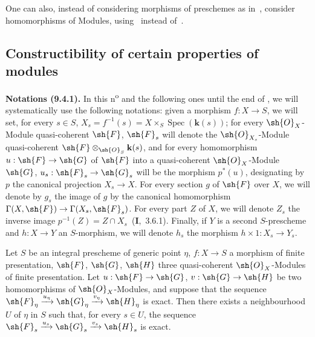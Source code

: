 One can also, instead of considering morphisms of preschemes as in~, consider homomorphisms of Modules, using~ instead of~.


\subsection{Constructibility of certain properties of modules}
\label{subsection:IV.9.4}

\begin{env}[9.4.1]
\label{IV.9.4.1}
\textbf{Notations (9.4.1).}
In this n\textsuperscript{o} and the following ones until the end of , we will systematically use the following notations: given a morphism $f:X\to S$, we will set, for every $s\in S$, $X_s=f^{-1}(s)=X\times_S\operatorname{Spec}(\mathbf{k}(s))$; for every $\sh{O}_X$-Module quasi-coherent $\sh{F}$, $\sh{F}_s$ will denote the $\sh{O}_{X_s}$-Module quasi-coherent $\sh{F}\otimes_{\sh{O}_S}\mathbf{k}(s)$, and for every homomorphism $u:\sh{F}\to\sh{G}$ of $\sh{F}$ into a quasi-coherent $\sh{O}_X$-Module $\sh{G}$, $u_s:\sh{F}_s\to\sh{G}_s$ will be the morphism $p^*(u)$, designating by $p$ the canonical projection $X_s\to X$.
For every section $g$ of $\sh{F}$ over $X$, we will denote by $g_s$ the image of $g$ by the canonical homomorphism $\Gamma(X,\sh{F})\to\Gamma(X_s,\sh{F}_s)$.
For every part $Z$ of $X$, we will denote $Z_s$ the inverse image $p^{-1}(Z)=Z\cap X_s$~(\textbf{I},~3.6.1).
Finally, if $Y$ is a second $S$-prescheme and $h:X\to Y$ an $S$-morphism, we will denote $h_s$ the morphism $h\times 1:X_s\to Y_s$.
\end{env}

\begin{proposition}[9.4.2]
\label{IV.9.4.2}
Let $S$ be an integral prescheme of generic point $\eta$, $f:X\to S$ a morphism of finite presentation, $\sh{F}$, $\sh{G}$, $\sh{H}$ three quasi-coherent $\sh{O}_X$-Modules of finite presentation.
Let $u:\sh{F}\to\sh{G}$, $v:\sh{G}\to\sh{H}$ be two homomorphisms of $\sh{O}_X$-Modules, and suppose that the sequence $\sh{F}_\eta\xrightarrow{u_\eta}\sh{G}_\eta\xrightarrow{v_\eta}\sh{H}_\eta$ is exact.
Then there exists a neighbourhood $U$ of $\eta$ in $S$ such that, for every $s\in U$, the sequence $\sh{F}_s\xrightarrow{u_s}\sh{G}_s\xrightarrow{v_s}\sh{H}_s$ is exact.
\end{proposition}

